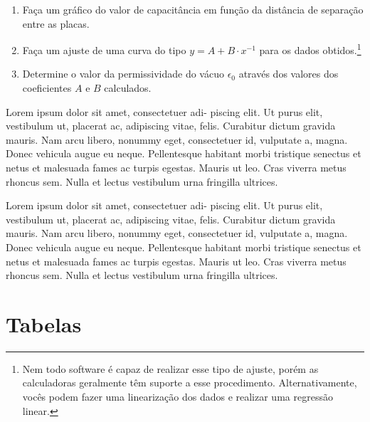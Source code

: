\begin{question}[type={exam}]{2}
\begin{enumerate}[label=\roman*.]
    \item Faça um gráfico do valor de capacitância em função da distância de separação entre as placas.
    \item Faça um ajuste de uma curva do tipo $y = A + B \cdot x^{-1}$ para os dados obtidos.\footnote{Nem todo software é capaz de realizar esse tipo de ajuste, porém as calculadoras geralmente têm suporte a esse procedimento. Alternativamente, vocês podem fazer uma linearização dos dados e realizar uma regressão linear.} 
    \item Determine o valor da permissividade do vácuo $\epsilon_0$ através dos valores dos  coeficientes $A$ e $B$ calculados. 
\end{enumerate}
\end{question}

\begin{question}[type={exam}]{2}
Lorem ipsum dolor sit amet, consectetuer adi-
piscing elit. Ut purus elit, vestibulum ut, placerat ac, adipiscing vitae,
felis. Curabitur dictum gravida mauris. Nam arcu libero, nonummy
eget, consectetuer id, vulputate a, magna. Donec vehicula augue
eu neque. Pellentesque habitant morbi tristique senectus et netus
et malesuada fames ac turpis egestas. Mauris ut leo. Cras viverra
metus rhoncus sem. Nulla et lectus vestibulum urna fringilla ultrices.
\end{question}



\begin{question}[type={exam}]{2}
Lorem ipsum dolor sit amet, consectetuer adi-
piscing elit. Ut purus elit, vestibulum ut, placerat ac, adipiscing vitae,
felis. Curabitur dictum gravida mauris. Nam arcu libero, nonummy
eget, consectetuer id, vulputate a, magna. Donec vehicula augue
eu neque. Pellentesque habitant morbi tristique senectus et netus
et malesuada fames ac turpis egestas. Mauris ut leo. Cras viverra
metus rhoncus sem. Nulla et lectus vestibulum urna fringilla ultrices.
\end{question}
\vfill
\pagebreak
\section{Tabelas}

